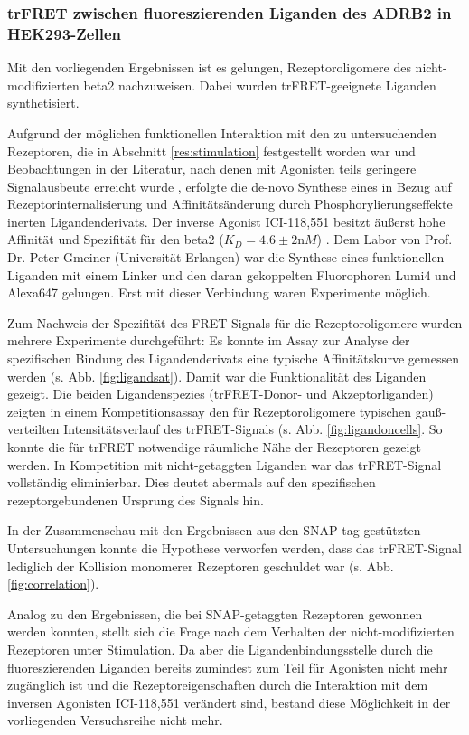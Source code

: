 \subsubsection{trFRET zwischen fluoreszierenden Liganden des ADRB2 in HEK293-Zellen}

Mit den vorliegenden Ergebnissen ist es gelungen, Rezeptoroligomere des nicht-modifizierten \gls{beta2} nachzuweisen. Dabei wurden trFRET-geeignete Liganden synthetisiert. 

Aufgrund der möglichen funktionellen Interaktion mit den zu untersuchenden Rezeptoren, die in Abschnitt \ref{res:stimulation} festgestellt worden war und Beobachtungen in der Literatur, nach denen mit Agonisten teils geringere Signalausbeute erreicht wurde \parencite{Albizu2010, Emami-Nemini2013}, erfolgte die de-novo Synthese eines in Bezug auf Rezeptorinternalisierung und Affinitätsänderung durch Phosphorylierungseffekte inerten Ligandenderivats. Der inverse Agonist ICI-118,551 besitzt äußerst hohe Affinität und Spezifität für den \gls{beta2} ($K_D=4.6 \pm 2\si{\nano M}$) \parencite{Mauriege1988}. Dem Labor von Prof. Dr. Peter Gmeiner (Universität Erlangen) war die Synthese eines funktionellen Liganden mit einem Linker und den daran gekoppelten Fluorophoren Lumi4 und Alexa647 gelungen. Erst mit dieser Verbindung waren Experimente möglich.

Zum Nachweis der Spezifität des FRET-Signals für die Rezeptoroligomere wurden mehrere Experimente durchgeführt: Es konnte im Assay zur Analyse der spezifischen Bindung des Ligandenderivats eine typische Affinitätskurve gemessen werden (s. Abb. \ref{fig:ligandsat}). Damit war die Funktionalität des Liganden gezeigt. Die beiden Ligandenspezies (trFRET-Donor- und Akzeptorliganden) zeigten in einem Kompetitionsassay den für Rezeptoroligomere typischen gauß-verteilten Intensitätsverlauf des trFRET-Signals (s. Abb. \ref{fig:ligandoncells}. So konnte die für trFRET notwendige räumliche Nähe der Rezeptoren gezeigt werden. In Kompetition mit nicht-getaggten Liganden war das trFRET-Signal vollständig eliminierbar. Dies deutet abermals auf den spezifischen rezeptorgebundenen Ursprung des Signals hin. 

In der Zusammenschau mit den Ergebnissen aus den SNAP-tag-gestützten Untersuchungen konnte die Hypothese verworfen werden, dass das trFRET-Signal lediglich der Kollision monomerer Rezeptoren geschuldet war (s. Abb. \ref{fig:correlation}).

Analog zu den Ergebnissen, die bei SNAP-getaggten Rezeptoren gewonnen werden konnten, stellt sich die Frage nach dem Verhalten der nicht-modifizierten Rezeptoren unter Stimulation. Da aber die Ligandenbindungsstelle durch die fluoreszierenden Liganden bereits zumindest zum Teil für Agonisten nicht mehr zugänglich ist und die Rezeptoreigenschaften durch die Interaktion mit dem inversen Agonisten ICI-118,551 verändert sind, bestand diese Möglichkeit in der vorliegenden Versuchsreihe nicht mehr.

